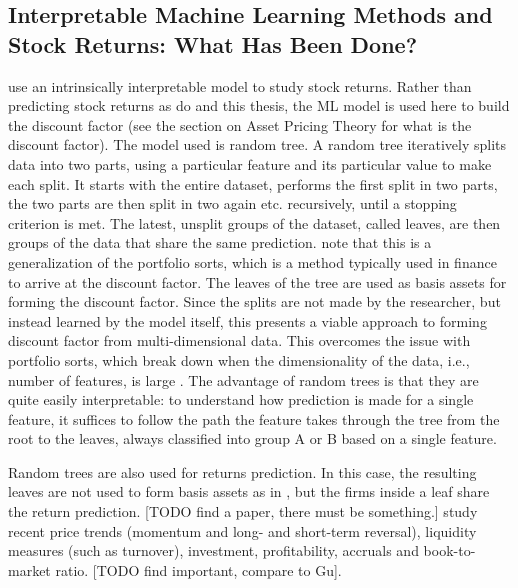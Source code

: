 		\subsection{Interpretable Machine Learning Methods and Stock Returns: What Has Been Done?}
			\cite{bryzgalova2019forest} use an intrinsically interpretable model to study stock returns. Rather than predicting stock returns as do \cite{gu2020empirical} and this thesis, the ML model is used here to build the discount factor (see the section on Asset Pricing Theory for what is the discount factor). The model used is random tree. A random tree iteratively splits data into two parts, using a particular feature and its particular value to make each split. It starts with the entire dataset, performs the first split in two parts, the two parts are then split in two again etc. recursively, until a stopping criterion is met. The latest, unsplit groups of the dataset, called leaves, are then groups of the data that share the same prediction. \cite{bryzgalova2019forest} note that this is a generalization of the portfolio sorts, which is a method typically used in finance to arrive at the discount factor. The leaves of the tree are used as basis assets for forming the discount factor. Since the splits are not made by the researcher, but instead learned by the model itself, this presents a viable approach to forming discount factor from multi-dimensional data. This overcomes the issue with portfolio sorts, which break down when the dimensionality of the data, i.e., number of features, is large \citep{cochrane2011presidential, bryzgalova2019forest}. The advantage of random trees is that they are quite easily interpretable: to understand how prediction is made for a single feature, it suffices to follow the path the feature takes through the tree from the root to the leaves, always classified into group A or B based on a single feature. 
			
			Random trees are also used for returns prediction. In this case, the resulting leaves are not used to form basis assets as in \cite{bryzgalova2019forest}, but the firms inside a leaf share the return prediction. [TODO find a paper, there must be something.] \cite{bryzgalova2019forest} study recent price trends (momentum and long- and short-term reversal), liquidity measures (such as turnover), investment, profitability, accruals and book-to-market ratio. [TODO find important, compare to Gu]. 
			
			\cite{gu2020empirical} 
			
			
			
